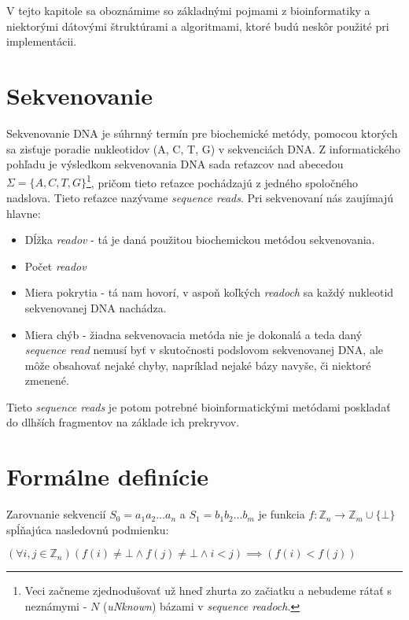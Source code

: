 V tejto kapitole sa oboznámime so základnými pojmami z bioinformatiky a
niektorými dátovými štruktúrami a algoritmami, ktoré budú neskôr použité pri
implementácii.

\section{Sekvenovanie}
\label{sec:sekvenovanie}
Sekvenovanie DNA je súhrnný termín pre biochemické metódy, pomocou ktorých sa zisťuje poradie nukleotidov (A, C, T, G) v sekvenciách DNA. Z informatického pohľadu je výsledkom sekvenovania DNA sada reťazcov nad abecedou $\Sigma = \{A, C, T, G\}$\footnote{Veci začneme zjednodušovať už hneď zhurta zo začiatku a nebudeme rátať s neznámymi - $N$ (\emph{uNknown}) bázami v \emph{sequence readoch}.}, pričom tieto reťazce pochádzajú z jedného spoločného nadslova. Tieto reťazce nazývame \emph{sequence reads}. Pri sekvenovaní nás zaujímajú hlavne:

\begin{itemize}
    \item Dĺžka \emph{readov} - tá je daná použitou biochemickou metódou sekvenovania.
    \item Počet \emph{readov}
    \item Miera pokrytia - tá nam hovorí, v aspoň koľkých \emph{readoch} sa každý nukleotid sekvenovanej DNA nachádza.
    \item Miera chýb - žiadna sekvenovacia metóda nie je dokonalá a teda daný \emph{sequence read} nemusí byť v skutočnosti podslovom sekvenovanej DNA, ale môže obsahovať nejaké chyby, napríklad nejaké bázy navyše, či niektoré zmenené.
\end{itemize}

Tieto \emph{sequence reads} je potom potrebné bioinformatickými metódami poskladať do dlhších fragmentov na základe ich prekryvov.


\section{Formálne definície}
\label{sec:formalne_definicie}
\begin{defn}
    Zarovnanie sekvencií $S_0=a_1 a_2 \ldots a_n$ a $S_1 = b_1 b_2 \ldots b_m$ je funkcia $f : \mathbb{Z}_n \to \mathbb{Z}_m \cup \{ \bot \} $ spĺňajúca nasledovnú podmienku:
        
    $ (\forall i, j \in \mathbb{Z}_n) (f(i) \neq \bot \wedge f(j) \neq \bot \wedge i < j) \implies (f(i) < f(j)) $
\end{defn}
    
